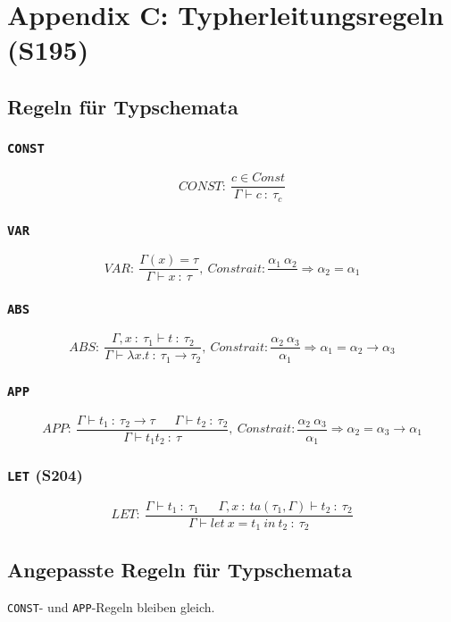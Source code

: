 \section{Appendix C: Typherleitungsregeln (S195)}

\subsection{Regeln für Typschemata}

\subsubsection{\texttt{CONST}}
\[CONST:~\frac{c \in Const}{\Gamma \vdash c~:~\tau_c}\]

\subsubsection{\texttt{VAR}}
\[VAR:~\frac{\Gamma(x)=\tau}{\Gamma \vdash x~:~\tau},~Constrait: \frac{\alpha_1~\alpha_2}{} \Rightarrow \alpha_2 = \alpha_1\]

\subsubsection{\texttt{ABS}}
\[ABS:~\frac{\Gamma,x~:~\tau_1 \vdash t~:~\tau_2}{\Gamma \vdash \lambda x.t~:~\tau_1 \rightarrow \tau_2},~Constrait: \frac{\alpha_2~\alpha_3}{\alpha_1} \Rightarrow \alpha_1 = \alpha_2 \rightarrow \alpha_3\]

\subsubsection{\texttt{APP}}
\[APP:~\frac{\Gamma \vdash t_1~:~\tau_2 \rightarrow \tau~~~~~~~\Gamma\vdash t_2~:~\tau_2}{\Gamma\vdash t_1t_2~:~\tau},~Constrait: \frac{\alpha_2~\alpha_3}{\alpha_1} \Rightarrow \alpha_2 = \alpha_3 \rightarrow \alpha_1\]

\subsubsection{\texttt{LET} (S204)}
\[LET:~\frac{\Gamma \vdash t_1~:~\tau_1~~~~~~~\Gamma,x~:~ta(\tau_1,\Gamma)\vdash t_2~:~\tau_2}{\Gamma \vdash let~x=t_1~in~t_2~:~\tau_2}\]


\subsection{Angepasste Regeln für Typschemata}
\texttt{CONST}- und \texttt{APP}-Regeln bleiben gleich.

